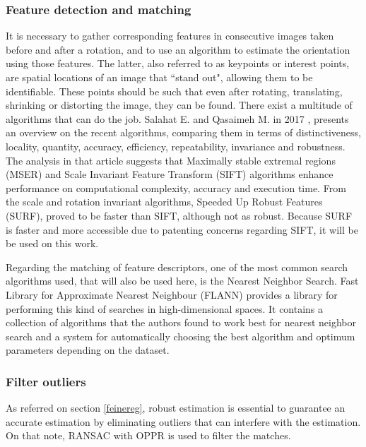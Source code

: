 \subsubsection{Feature detection and matching}
It is necessary to gather corresponding features in consecutive images taken before and after a rotation, and to use an algorithm to estimate the orientation using those features. The latter, also referred to as keypoints or interest points, are spatial locations of an image that ``stand out", allowing them to be identifiable. These points should be such that even after rotating, translating, shrinking or distorting the image, they can be found. There exist a multitude of algorithms that can do the job. Salahat E. and Qasaimeh M. in 2017 \cite{featsift}, presents an overview on the recent algorithms, comparing them in terms of distinctiveness, locality, quantity, accuracy, efficiency, repeatability, invariance and robustness. The analysis in that article suggests that Maximally stable extremal regions (MSER) and Scale Invariant Feature Transform (SIFT) algorithms enhance performance on computational complexity, accuracy and execution time. From the scale and rotation invariant algorithms, Speeded Up Robust Features (SURF), proved to be faster than SIFT, although not as robust. Because SURF is faster and more accessible due to patenting concerns regarding SIFT, it will be be used on this work.

Regarding the matching of feature descriptors, one of the most common search algorithms used, that will also be used here, is the Nearest Neighbor Search. Fast Library for Approximate Nearest Neighbour (FLANN) \cite{flann} provides a library for performing this kind of searches in high-dimensional spaces. It contains a collection of algorithms that the authors found to  work best for nearest neighbor search and a system for automatically choosing the best algorithm and optimum parameters depending on the dataset.

\subsubsection{Filter outliers}
As referred on section \ref{feinereg}, robust estimation is essential to guarantee an accurate estimation by eliminating outliers that can interfere with the estimation. On that note, RANSAC with OPPR is used to filter the matches.

